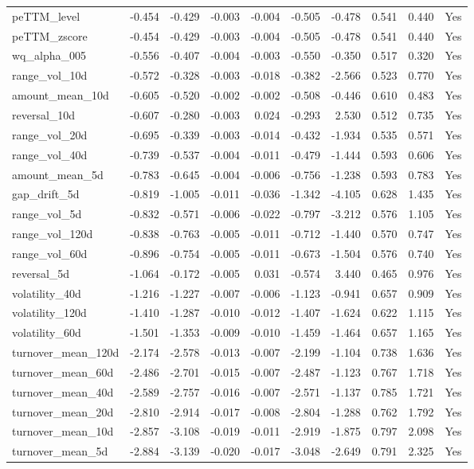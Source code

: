 \begin{longtable}{lrrrrrrrrl}
peTTM\_level & -0.454 & -0.429 & -0.003 & -0.004 & -0.505 & -0.478 & 0.541 & 0.440 & Yes \\
peTTM\_zscore & -0.454 & -0.429 & -0.003 & -0.004 & -0.505 & -0.478 & 0.541 & 0.440 & Yes \\
wq\_alpha\_005 & -0.556 & -0.407 & -0.004 & -0.003 & -0.550 & -0.350 & 0.517 & 0.320 & Yes \\
range\_vol\_10d & -0.572 & -0.328 & -0.003 & -0.018 & -0.382 & -2.566 & 0.523 & 0.770 & Yes \\
amount\_mean\_10d & -0.605 & -0.520 & -0.002 & -0.002 & -0.508 & -0.446 & 0.610 & 0.483 & Yes \\
reversal\_10d & -0.607 & -0.280 & -0.003 & 0.024 & -0.293 & 2.530 & 0.512 & 0.735 & Yes \\
range\_vol\_20d & -0.695 & -0.339 & -0.003 & -0.014 & -0.432 & -1.934 & 0.535 & 0.571 & Yes \\
range\_vol\_40d & -0.739 & -0.537 & -0.004 & -0.011 & -0.479 & -1.444 & 0.593 & 0.606 & Yes \\
amount\_mean\_5d & -0.783 & -0.645 & -0.004 & -0.006 & -0.756 & -1.238 & 0.593 & 0.783 & Yes \\
gap\_drift\_5d & -0.819 & -1.005 & -0.011 & -0.036 & -1.342 & -4.105 & 0.628 & 1.435 & Yes \\
range\_vol\_5d & -0.832 & -0.571 & -0.006 & -0.022 & -0.797 & -3.212 & 0.576 & 1.105 & Yes \\
range\_vol\_120d & -0.838 & -0.763 & -0.005 & -0.011 & -0.712 & -1.440 & 0.570 & 0.747 & Yes \\
range\_vol\_60d & -0.896 & -0.754 & -0.005 & -0.011 & -0.673 & -1.504 & 0.576 & 0.740 & Yes \\
reversal\_5d & -1.064 & -0.172 & -0.005 & 0.031 & -0.574 & 3.440 & 0.465 & 0.976 & Yes \\
volatility\_40d & -1.216 & -1.227 & -0.007 & -0.006 & -1.123 & -0.941 & 0.657 & 0.909 & Yes \\
volatility\_120d & -1.410 & -1.287 & -0.010 & -0.012 & -1.407 & -1.624 & 0.622 & 1.115 & Yes \\
volatility\_60d & -1.501 & -1.353 & -0.009 & -0.010 & -1.459 & -1.464 & 0.657 & 1.165 & Yes \\
turnover\_mean\_120d & -2.174 & -2.578 & -0.013 & -0.007 & -2.199 & -1.104 & 0.738 & 1.636 & Yes \\
turnover\_mean\_60d & -2.486 & -2.701 & -0.015 & -0.007 & -2.487 & -1.123 & 0.767 & 1.718 & Yes \\
turnover\_mean\_40d & -2.589 & -2.757 & -0.016 & -0.007 & -2.571 & -1.137 & 0.785 & 1.721 & Yes \\
turnover\_mean\_20d & -2.810 & -2.914 & -0.017 & -0.008 & -2.804 & -1.288 & 0.762 & 1.792 & Yes \\
turnover\_mean\_10d & -2.857 & -3.108 & -0.019 & -0.011 & -2.919 & -1.875 & 0.797 & 2.098 & Yes \\
turnover\_mean\_5d & -2.884 & -3.139 & -0.020 & -0.017 & -3.048 & -2.649 & 0.791 & 2.325 & Yes \\
\bottomrule
\end{longtable}
\normalsize
